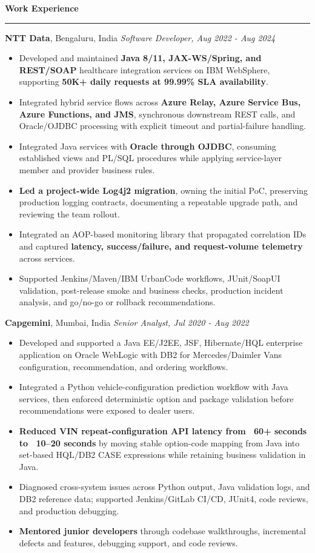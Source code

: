 \documentclass[11pt,letterpaper]{article}
\newcommand{\ressection}[1]{\Needspace{6\baselineskip}\vspace{8pt}\par\textbf{#1}\par\vspace{2pt}\hrule\vspace{5pt}}
\begin{document}
\ressection{Work Experience}
\textbf{NTT Data}, Bengaluru, India \hfill \textit{Software Developer, Aug 2022 - Aug 2024}
\begin{itemize}
  \item Developed and maintained \textbf{Java 8/11, JAX-WS/Spring, and REST/SOAP} healthcare integration services on IBM WebSphere, supporting \textbf{50K+ daily requests at 99.99\% SLA availability}.
  \item Integrated hybrid service flows across \textbf{Azure Relay, Azure Service Bus, Azure Functions, and JMS}, synchronous downstream REST calls, and Oracle/OJDBC processing with explicit timeout and partial-failure handling.
  \item Integrated Java services with \textbf{Oracle through OJDBC}, consuming established views and PL/SQL procedures while applying service-layer member and provider business rules.
  \item \textbf{Led a project-wide Log4j2 migration}, owning the initial PoC, preserving production logging contracts, documenting a repeatable upgrade path, and reviewing the team rollout.
  \item Integrated an AOP-based monitoring library that propagated correlation IDs and captured \textbf{latency, success/failure, and request-volume telemetry} across services.
  \item Supported Jenkins/Maven/IBM UrbanCode workflows, JUnit/SoapUI validation, post-release smoke and business checks, production incident analysis, and go/no-go or rollback recommendations.
\end{itemize}
\textbf{Capgemini}, Mumbai, India \hfill \textit{Senior Analyst, Jul 2020 - Aug 2022}
\begin{itemize}
  \item Developed and supported a Java EE/J2EE, JSF, Hibernate/HQL enterprise application on Oracle WebLogic with DB2 for Mercedes/Daimler Vans configuration, recommendation, and ordering workflows.
  \item Integrated a Python vehicle-configuration prediction workflow with Java services, then enforced deterministic option and package validation before recommendations were exposed to dealer users.
  \item \textbf{Reduced VIN repeat-configuration API latency from ~60+ seconds to ~10--20 seconds} by moving stable option-code mapping from Java into set-based HQL/DB2 CASE expressions while retaining business validation in Java.
  \item Diagnosed cross-system issues across Python output, Java validation logs, and DB2 reference data; supported Jenkins/GitLab CI/CD, JUnit4, code reviews, and production debugging.
  \item \textbf{Mentored junior developers} through codebase walkthroughs, incremental defects and features, debugging support, and code reviews.
\end{itemize}
\end{document}
